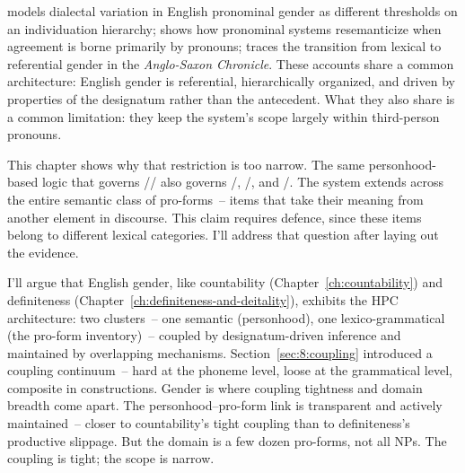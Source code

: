 \textcite{siemund2008} models dialectal variation in English pronominal gender as different thresholds on an individuation hierarchy; \textcite{audring2009} shows how pronominal systems resemanticize when agreement is borne primarily by pronouns; \textcite{dolberg2019} traces the transition from lexical to referential gender in the \textit{Anglo-Saxon Chronicle}. These accounts share a common architecture: English gender is referential, hierarchically organized, and driven by properties of the designatum rather than the antecedent. What they also share is a common limitation: they keep the system's scope largely within third-person pronouns.

This chapter shows why that restriction is too narrow. The same personhood-based logic that governs // also governs /, /, and /. The system extends across the entire semantic class of pro-forms~-- items that take their meaning from another element in discourse. This claim requires defence, since these items belong to different lexical categories. I'll address that question after laying out the evidence.

I'll argue that English gender, like countability (Chapter~\ref{ch:countability}) and definiteness (Chapter~\ref{ch:definiteness-and-deitality}), exhibits the HPC architecture: two clusters~-- one semantic (personhood), one lexico-grammatical (the pro-form inventory)~-- coupled by designatum-driven inference and maintained by overlapping mechanisms. Section~\ref{sec:8:coupling} introduced a coupling continuum~-- hard at the phoneme level, loose at the grammatical level, composite in constructions. Gender is where coupling tightness and domain breadth come apart. The personhood--pro-form link is transparent and actively maintained~-- closer to countability's tight coupling than to definiteness's productive slippage. But the domain is a few dozen pro-forms, not all NPs. The coupling is tight; the scope is narrow.


